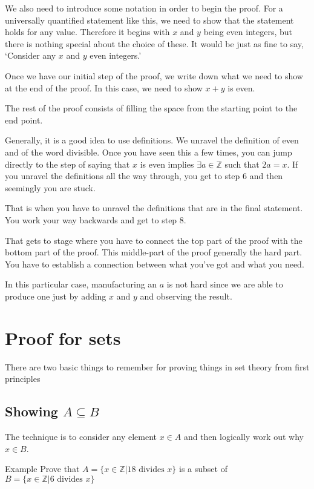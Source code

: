 \documentclass[12pt]{article}
\begin{document}
We also need to introduce some notation in order to begin the proof. For a universally quantified statement like this, we need to show that the statement holds for any value. Therefore it begins with $x$ and $y$ being even integers, but there is nothing special about the choice of these. It would be just as fine to say, `Consider any $x$ and $y$ even integers.'

Once we have our initial step of the proof, we write down what we need to show at the end of the proof. In this case, we need to show $x + y$ is even.

The rest of the proof consists of filling the space from the starting point to the end point. 

Generally, it is a good idea to use definitions. We unravel the definition of even and of the word divisible. Once you have seen this a few times, you can jump directly to the step of saying that $x$ is even implies $\exists a \in \mathbb{Z}$ such that $2a = x$.  If you unravel the definitions all the way through, you get to step 6 and then seemingly you are stuck.

That is when you have to unravel the definitions that are in the final statement. You work your way backwards and get to step 8. 

That gets to stage where you have to connect the top part of the proof with the bottom part of the proof. This middle-part of the proof generally the hard part. You have to establish a connection between what you've got and what you need. 

In this particular case, manufacturing an $a$ is not hard since we are able to produce one just by adding $x$ and $y$ and observing the result.

\section*{Proof for sets}
There are two basic things to remember for proving things in set theory from first principles

\subsection*{Showing $A \subseteq B$}

The technique is to consider any element $x \in A$ and then logically work out why $x \in B$.

Example Prove that $A = \{x \in \mathbb{Z}| 18 \text{ divides } x \}$ is a subset of $B = \{x \in \mathbb{Z} | 6 \text{ divides }x\}$
\end{document}
